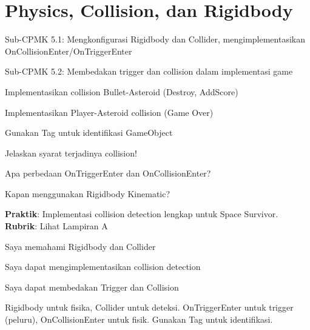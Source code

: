 \documentclass[../main]{subfiles}
\begin{document}
\chapter{Physics, Collision, dan Rigidbody}

\begin{subcpmk}
  \item Sub-CPMK 5.1: Mengkonfigurasi Rigidbody dan Collider, mengimplementasikan OnCollisionEnter/OnTriggerEnter
  \item Sub-CPMK 5.2: Membedakan trigger dan collision dalam implementasi game
\end{subcpmk}




\begin{aktivitas}
  \item Implementasikan collision Bullet-Asteroid (Destroy, AddScore)
  \item Implementasikan Player-Asteroid collision (Game Over)
  \item Gunakan Tag untuk identifikasi GameObject
\end{aktivitas}

\begin{latihan}
  \item Jelaskan syarat terjadinya collision!
  \item Apa perbedaan OnTriggerEnter dan OnCollisionEnter?
  \item Kapan menggunakan Rigidbody Kinematic?
\end{latihan}

\begin{asesmen}
\textbf{Praktik}: Implementasi collision detection lengkap untuk Space Survivor.
\textbf{Rubrik}: Lihat Lampiran A
\end{asesmen}

\begin{checklist}
  \item Saya memahami Rigidbody dan Collider
  \item Saya dapat mengimplementasikan collision detection
  \item Saya dapat membedakan Trigger dan Collision
\end{checklist}

\begin{rangkuman}
Rigidbody untuk fisika, Collider untuk deteksi. OnTriggerEnter untuk trigger (peluru), OnCollisionEnter untuk fisik. Gunakan Tag untuk identifikasi.
\end{rangkuman}

\ifSubfilesClassLoaded{
  \renewcommand{\bibname}{Daftar Pustaka}
  
  
}{}
\end{document}
